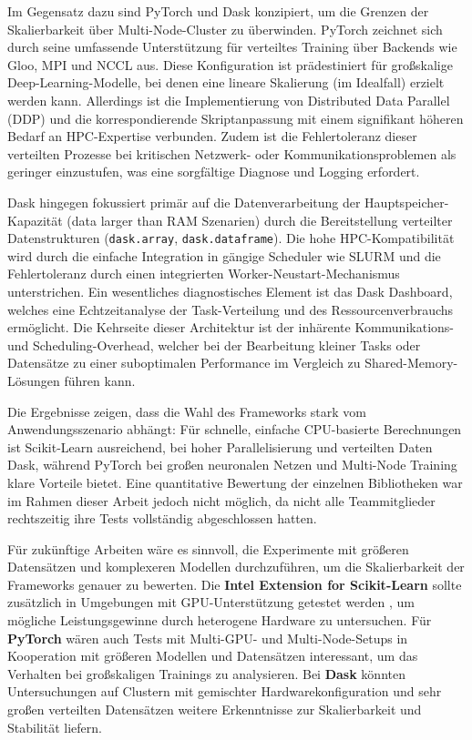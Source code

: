 \documentclass{article}
\begin{document}
Im Gegensatz dazu sind PyTorch und Dask konzipiert, um die Grenzen der Skalierbarkeit 
über Multi-Node-Cluster zu überwinden. PyTorch zeichnet sich durch seine umfassende 
Unterstützung für verteiltes Training über Backends wie Gloo, MPI und NCCL aus. Diese 
Konfiguration ist prädestiniert für großskalige Deep-Learning-Modelle, bei denen eine 
lineare Skalierung (im Idealfall) erzielt werden kann. Allerdings ist die Implementierung 
von Distributed Data Parallel (DDP) und die korrespondierende Skriptanpassung mit einem 
signifikant höheren Bedarf an HPC-Expertise verbunden. Zudem ist die Fehlertoleranz dieser 
verteilten Prozesse bei kritischen Netzwerk- oder Kommunikationsproblemen als geringer 
einzustufen, was eine sorgfältige Diagnose und Logging erfordert.

Dask hingegen fokussiert primär auf die Datenverarbeitung der 
Hauptspeicher-Kapazität (data larger than RAM Szenarien) durch die Bereitstellung 
verteilter Datenstrukturen (\texttt{dask.array}, \texttt{dask.dataframe}). Die hohe 
HPC-Kompatibilität wird durch die einfache Integration in gängige Scheduler wie SLURM 
und die Fehlertoleranz durch einen integrierten Worker-Neustart-Mechanismus unterstrichen. 
Ein wesentliches diagnostisches Element ist das Dask Dashboard, welches eine 
Echtzeitanalyse der Task-Verteilung und des Ressourcenverbrauchs ermöglicht. Die 
Kehrseite dieser Architektur ist der inhärente Kommunikations- und Scheduling-Overhead, 
welcher bei der Bearbeitung kleiner Tasks oder Datensätze zu einer suboptimalen Performance 
im Vergleich zu Shared-Memory-Lösungen führen kann.

Die Ergebnisse zeigen, dass die Wahl des Frameworks stark vom 
Anwendungsszenario abhängt: Für schnelle, einfache CPU-basierte 
Berechnungen ist Scikit-Learn ausreichend, bei hoher Parallelisierung und 
verteilten Daten Dask, während PyTorch bei großen neuronalen Netzen und 
Multi-Node Training klare Vorteile bietet. 
Eine quantitative Bewertung der einzelnen Bibliotheken war im Rahmen dieser Arbeit jedoch nicht möglich, da nicht alle Teammitglieder rechtszeitig ihre Tests vollständig abgeschlossen hatten. 

Für zukünftige Arbeiten wäre es sinnvoll, die Experimente mit größeren Datensätzen und komplexeren Modellen durchzuführen, um die Skalierbarkeit der Frameworks genauer zu bewerten. 
Die \textbf{Intel Extension for Scikit-Learn} sollte zusätzlich in Umgebungen mit GPU-Unterstützung getestet werden \parencite{intel2025oneapi}, um mögliche Leistungsgewinne durch heterogene Hardware zu untersuchen. 
Für \textbf{PyTorch} wären auch Tests mit Multi-GPU- und Multi-Node-Setups in Kooperation mit größeren Modellen und Datensätzen interessant, um das Verhalten bei großskaligen Trainings zu analysieren. 
Bei \textbf{Dask} könnten Untersuchungen auf Clustern mit gemischter Hardwarekonfiguration und sehr großen verteilten Datensätzen weitere Erkenntnisse zur Skalierbarkeit und Stabilität liefern.
\end{document}
